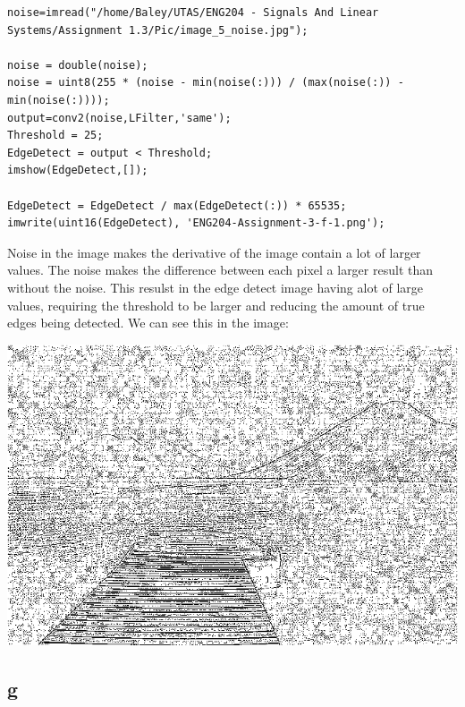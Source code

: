 \documentclass[11pt]{article}
\begin{document}
\begin{verbatim}
noise=imread("/home/Baley/UTAS/ENG204 - Signals And Linear Systems/Assignment 1.3/Pic/image_5_noise.jpg");

noise = double(noise);
noise = uint8(255 * (noise - min(noise(:))) / (max(noise(:)) - min(noise(:))));
output=conv2(noise,LFilter,'same');
Threshold = 25;
EdgeDetect = output < Threshold;
imshow(EdgeDetect,[]);

EdgeDetect = EdgeDetect / max(EdgeDetect(:)) * 65535;
imwrite(uint16(EdgeDetect), 'ENG204-Assignment-3-f-1.png');
\end{verbatim}
Noise in the image makes the derivative of the image contain a lot of larger values. The noise makes the difference between each pixel a larger result than without the noise. This resulst in the edge detect image having alot of large values, requiring the threshold to be larger and reducing the amount of true edges being detected. We can see this in the image:
\begin{center}
\includegraphics[width=.9\linewidth]{ENG204-Assignment-3-f-1.png}
\end{center}
\subsection{g}
\label{sec:orgd717fca}
\end{document}
